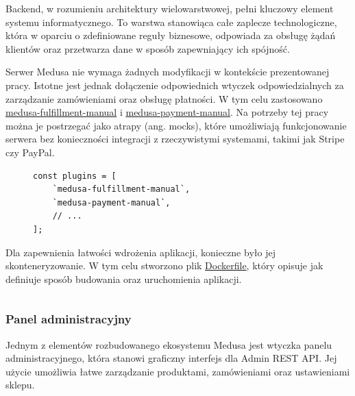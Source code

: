 
Backend, w rozumieniu architektury wielowarstwowej, pełni kluczowy element systemu informatycznego.
To warstwa stanowiąca całe zaplecze technologiczne, która w oparciu o zdefiniowane reguły biznesowe, odpowiada za obsługę żądań klientów oraz przetwarza dane w sposób zapewniający ich spójność.


Serwer Medusa nie wymaga żadnych modyfikacji w kontekście prezentowanej pracy.
Istotne jest jednak dołączenie odpowiednich wtyczek odpowiedzialnych za zarządzanie zamówieniami oraz obsługę płatności.
W tym celu zastosowano \url{medusa-fulfillment-manual}  i \url{medusa-payment-manual}.
Na potrzeby tej pracy można je postrzegać jako atrapy (ang. mocks), które umożliwiają funkcjonowanie serwera bez konieczności integracji z rzeczywistymi systemami, takimi jak Stripe czy PayPal.

\begin{figure}[H]
    \begin{verbatim}
const plugins = [
    `medusa-fulfillment-manual`,
    `medusa-payment-manual`,
    // ...
];
    \end{verbatim}
    \label{fig:medusa-config-fulfillment-payment}
\end{figure}

Dla zapewnienia łatwości wdrożenia aplikacji, konieczne było jej skonteneryzowanie.
W tym celu stworzono plik \url{Dockerfile}, który opisuje jak definiuje sposób budowania oraz uruchomienia aplikacji.

\begin{figure}[H]
    \inputminted{docker}{code/Dockerfile.backend}
\end{figure}

\subsubsection{Panel administracyjny}


Jednym z elementów rozbudowanego ekosystemu Medusa jest wtyczka panelu administracyjnego, która stanowi graficzny interfejs dla Admin REST API.
Jej użycie umożliwia łatwe zarządzanie produktami, zamówieniami oraz ustawieniami sklepu.

